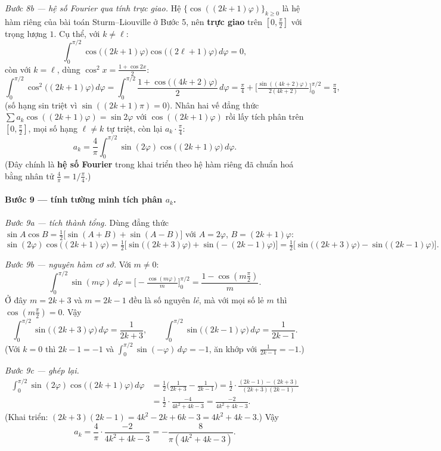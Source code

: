 \emph{Bước 8b --- hệ số Fourier qua tính trực giao.} Hệ $\{\cos((2k+1)\varphi)\}_{k\ge0}$ là hệ hàm riêng của bài toán Sturm--Liouville ở Bước 5, nên \textbf{trực giao} trên $[0,\tfrac{\pi}{2}]$ với trọng lượng $1$. Cụ thể, với $k\ne\ell$:
\[
  \int_0^{\pi/2}\cos\!\big((2k+1)\varphi\big)\cos\!\big((2\ell+1)\varphi\big)\,d\varphi=0,
\]
còn với $k=\ell$, dùng $\cos^2 x=\tfrac{1+\cos 2x}{2}$:
\[
  \int_0^{\pi/2}\cos^2\!\big((2k+1)\varphi\big)\,d\varphi
  =\int_0^{\pi/2}\frac{1+\cos\!\big((4k+2)\varphi\big)}{2}\,d\varphi
  =\tfrac{\pi}{4}+\Big[\tfrac{\sin((4k+2)\varphi)}{2(4k+2)}\Big]_0^{\pi/2}
  =\tfrac{\pi}{4},
\]
(số hạng sin triệt vì $\sin((2k+1)\pi)=0$). Nhân hai vế đẳng thức $\sum a_k\cos((2k+1)\varphi)=\sin 2\varphi$ với $\cos((2k+1)\varphi)$ rồi lấy tích phân trên $[0,\tfrac{\pi}{2}]$, mọi số hạng $\ell\ne k$ tự triệt, còn lại $a_k\cdot\tfrac{\pi}{4}$:
\[
  a_k=\frac{4}{\pi}\int_0^{\pi/2}\sin(2\varphi)\cos\!\big((2k+1)\varphi\big)\,d\varphi.
\]
(Đây chính là \textbf{hệ số Fourier} trong khai triển theo hệ hàm riêng đã chuẩn hoá bằng nhân tử $\tfrac{4}{\pi}=1\big/\tfrac{\pi}{4}$.)

\paragraph{Bước 9 --- tính tường minh tích phân $a_k$.}
\emph{Bước 9a --- tích thành tổng.} Dùng đẳng thức $\sin A\cos B=\tfrac12\big[\sin(A+B)+\sin(A-B)\big]$ với $A=2\varphi$, $B=(2k+1)\varphi$:
\[
  \sin(2\varphi)\cos\!\big((2k+1)\varphi\big)
  =\tfrac12\big[\sin\!\big((2k+3)\varphi\big)+\sin\!\big(-(2k-1)\varphi\big)\big]
  =\tfrac12\big[\sin\!\big((2k+3)\varphi\big)-\sin\!\big((2k-1)\varphi\big)\big].
\]

\emph{Bước 9b --- nguyên hàm cơ sở.} Với $m\ne 0$:
\[
  \int_0^{\pi/2}\sin(m\varphi)\,d\varphi=\Big[-\tfrac{\cos(m\varphi)}{m}\Big]_0^{\pi/2}=\frac{1-\cos(m\tfrac{\pi}{2})}{m}.
\]
Ở đây $m=2k+3$ và $m=2k-1$ đều là số nguyên \emph{lẻ}, mà với mọi số lẻ $m$ thì $\cos(m\tfrac{\pi}{2})=0$. Vậy
\[
  \int_0^{\pi/2}\sin\!\big((2k+3)\varphi\big)\,d\varphi=\frac{1}{2k+3},\qquad
  \int_0^{\pi/2}\sin\!\big((2k-1)\varphi\big)\,d\varphi=\frac{1}{2k-1}.
\]
(Với $k=0$ thì $2k-1=-1$ và $\int_0^{\pi/2}\sin(-\varphi)\,d\varphi=-1$, ăn khớp với $\tfrac{1}{2k-1}=-1$.)

\emph{Bước 9c --- ghép lại.}
\[
  \begin{aligned}
  \int_0^{\pi/2}\sin(2\varphi)\cos\!\big((2k+1)\varphi\big)\,d\varphi
  &=\tfrac12\Big(\frac{1}{2k+3}-\frac{1}{2k-1}\Big)
  =\tfrac12\cdot\frac{(2k-1)-(2k+3)}{(2k+3)(2k-1)}\\
  &=\tfrac12\cdot\frac{-4}{4k^2+4k-3}
  =\frac{-2}{4k^2+4k-3}.
  \end{aligned}
\]
(Khai triển: $(2k+3)(2k-1)=4k^2-2k+6k-3=4k^2+4k-3$.) Vậy
\[
  a_k=\frac{4}{\pi}\cdot\frac{-2}{4k^2+4k-3}=-\frac{8}{\pi(4k^2+4k-3)}.
\]

